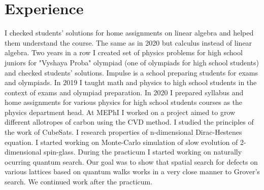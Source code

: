 \documentclass[11pt,a4paper,sans]{moderncv}        %
\begin{document}
\section{Experience}
{I checked students' solutions for home assignments on linear algebra and helped them understand the course.} 
{The same as in 2020 but calculus instead of linear algebra.}
{Two years in a row I created set of physics problems for high school juniors for "Vyshaya Proba" olympiad (one of olympiads for high school students) and checked students' solutions.}
{Impulse is a school preparing students for exams and olympiads. In 2019 I taught math and physics to high school students in the context of exams and olympiad preparation. In 2020 I prepared syllabus and home assignments for various physics for high school students courses as the physics department head.} 
{At MEPhI I worked on a project aimed to grow different allotropes of carbon using the CVD method.} 
{I studied the principles of the work of CubeSats.} 
{I research properties of n-dimensional Dirac-Hestenes equation.}
{I started working on Monte-Carlo simulation of slow evolution of 2-dimensional spin-glass.}
{During the practicum I started working on naturally ocurring quantum search. Our goal was to show that spatial search for defects on various lattices based on quantum walks works in a very close manner to Grover's search. We continued work after the practicum.}
\end{document}
